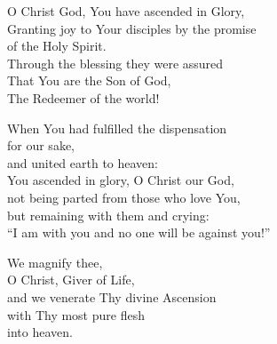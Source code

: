 \documentclass{article}
\begin{document}
%
O Christ God, You have ascended in Glory, \\
Granting joy to Your disciples by the promise \\
    \cont of the Holy Spirit. \\
Through the blessing they were assured \\
That You are the Son of God, \\
The Redeemer of the world!

When You had fulfilled the dispensation \\
    \cont for our sake,\\
and united earth to heaven:\\
You ascended in glory, O Christ our God, \\
not being parted from those who love You, \\
but remaining with them and crying: \\
“I am with you and no one will be against you!”

We magnify thee, \\
O Christ, Giver of Life, \\
and we venerate Thy divine Ascension \\
with Thy most pure flesh \\
into heaven.

\vfill
\end{document}
